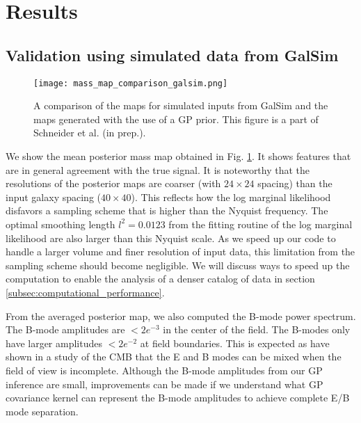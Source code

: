 \section{Results}

\subsection{Validation using simulated data from {\sc GalSim}}
\begin{figure}[!ht]
	\centering
	\texttt{[image: mass\_map\_comparison\_galsim.png]}
	\caption{A comparison of the maps for simulated inputs from {\sc GalSim} and
	the maps generated with the use of a GP prior. 
	This figure is a part of Schneider et al. (in prep.). \label{fig:Galsim_massmap}
}
\end{figure}
We show the mean posterior mass map obtained in Fig. \ref{fig:Galsim_massmap}. 
It shows features that are in general agreement with the true signal. 
It is noteworthy that the resolutions of the posterior maps are coarser (with $24 \times 24$
spacing) than the input galaxy
spacing ($40 \times 40$). This reflects how the log marginal likelihood disfavors a sampling
scheme that is higher than the Nyquist frequency. The optimal smoothing length
$l^2 = 0.0123$ from the fitting routine of the log marginal likelihood are also
larger than this Nyquist scale. As we speed up our code to handle a larger
volume and finer
resolution of input data, this limitation from the sampling scheme should
become negligible. We will discuss ways to speed up the computation to enable
the analysis of a denser catalog of data in section
\ref{subsec:computational_performance}. 

From the averaged posterior map, we also computed the B-mode power spectrum.
The B-mode amplitudes are $< 2e^{-3}$ in the center of the field. 
The B-modes only have larger amplitudes $< 2e^{-2}$ at field boundaries.  
This is expected as \cite{Bunn2003} have shown in a study of the CMB that 
the E and B modes can be mixed when the field of view is incomplete.
Although the B-mode amplitudes from our GP inference are small, 
improvements can be made 
if we understand what GP covariance kernel can represent the B-mode amplitudes to achieve complete E/B mode
separation.

